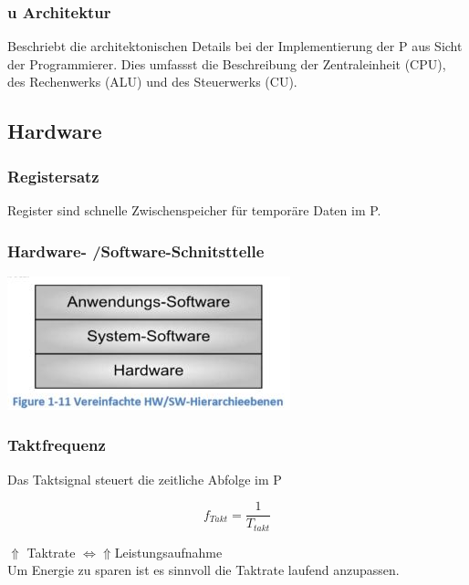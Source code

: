 \subsubsection{u Architektur}
Beschriebt die architektonischen Details bei der Implementierung der \mu P aus Sicht der Programmierer.
Dies umfassst die Beschreibung der Zentraleinheit (CPU), des Rechenwerks (ALU) und des Steuerwerks (CU).



\begin{minipage}{10cm}
\subsection{Hardware}
\subsubsection{Registersatz}
Register sind schnelle Zwischenspeicher für \newline
temporäre Daten im \mu P.
\end{minipage}
\begin{minipage}{0.5\linewidth}
\subsubsection{Hardware- /Software-Schnitsttelle}
\includegraphics{images/HardwareSoftware}
\end{minipage}

\subsubsection{Taktfrequenz}
Das Taktsignal steuert die zeitliche Abfolge im \mu P \newline
\begin{multicols}{2}
        \begin{minipage}{\linewidth}
    \[ f_{Takt}= \frac{1}{T_{takt}} \]
        \end{minipage}
    
    \begin{minipage}{\linewidth}
        $ \Uparrow $ Taktrate $ \Leftrightarrow $$  \Uparrow  $Leistungsaufnahme \\
        Um Energie zu sparen ist es sinnvoll die Taktrate laufend anzupassen.\\
    \end{minipage}
\end{multicols}
